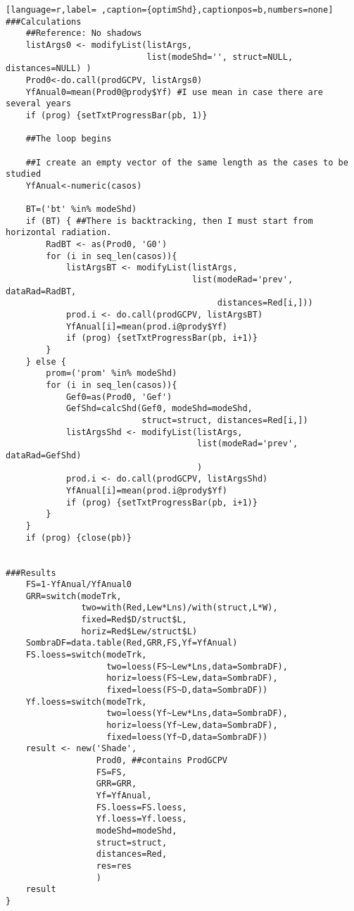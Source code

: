\begin{lstlisting}[language=r,label= ,caption={optimShd},captionpos=b,numbers=none]
###Calculations	
    ##Reference: No shadows	
    listArgs0 <- modifyList(listArgs,
                            list(modeShd='', struct=NULL, distances=NULL) )
    Prod0<-do.call(prodGCPV, listArgs0)
    YfAnual0=mean(Prod0@prody$Yf) #I use mean in case there are several years
    if (prog) {setTxtProgressBar(pb, 1)}

    ##The loop begins

    ##I create an empty vector of the same length as the cases to be studied
    YfAnual<-numeric(casos) 

    BT=('bt' %in% modeShd)
    if (BT) { ##There is backtracking, then I must start from horizontal radiation.
        RadBT <- as(Prod0, 'G0')
        for (i in seq_len(casos)){
            listArgsBT <- modifyList(listArgs,
                                     list(modeRad='prev', dataRad=RadBT,
                                          distances=Red[i,]))
            prod.i <- do.call(prodGCPV, listArgsBT)
            YfAnual[i]=mean(prod.i@prody$Yf)
            if (prog) {setTxtProgressBar(pb, i+1)}
        }
    } else {
        prom=('prom' %in% modeShd)
        for (i in seq_len(casos)){
            Gef0=as(Prod0, 'Gef')
            GefShd=calcShd(Gef0, modeShd=modeShd,
                           struct=struct, distances=Red[i,])
            listArgsShd <- modifyList(listArgs,
                                      list(modeRad='prev', dataRad=GefShd)
                                      )
            prod.i <- do.call(prodGCPV, listArgsShd)
            YfAnual[i]=mean(prod.i@prody$Yf)
            if (prog) {setTxtProgressBar(pb, i+1)}
        }
    }
    if (prog) {close(pb)}


###Results
    FS=1-YfAnual/YfAnual0
    GRR=switch(modeTrk,
               two=with(Red,Lew*Lns)/with(struct,L*W),
               fixed=Red$D/struct$L,
               horiz=Red$Lew/struct$L)
    SombraDF=data.table(Red,GRR,FS,Yf=YfAnual)
    FS.loess=switch(modeTrk,
                    two=loess(FS~Lew*Lns,data=SombraDF),
                    horiz=loess(FS~Lew,data=SombraDF),
                    fixed=loess(FS~D,data=SombraDF))
    Yf.loess=switch(modeTrk,
                    two=loess(Yf~Lew*Lns,data=SombraDF),
                    horiz=loess(Yf~Lew,data=SombraDF),
                    fixed=loess(Yf~D,data=SombraDF))
    result <- new('Shade',
                  Prod0, ##contains ProdGCPV
                  FS=FS,
                  GRR=GRR,
                  Yf=YfAnual,
                  FS.loess=FS.loess,
                  Yf.loess=Yf.loess,
                  modeShd=modeShd,
                  struct=struct,
                  distances=Red,
                  res=res
                  )
    result
}
\end{lstlisting}
